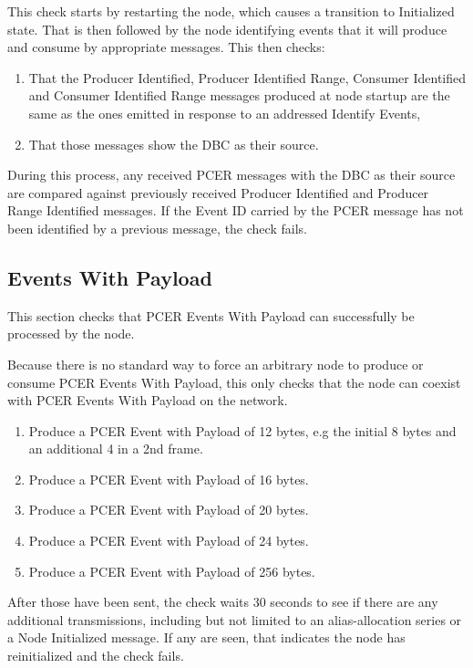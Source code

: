 This check starts by restarting the node, which causes a transition to Initialized
state.  That is then followed by the node identifying events that it will 
produce and consume by appropriate messages. This then checks:

\begin{enumerate}
\item That the Producer Identified, Producer Identified Range, Consumer Identified 
    and Consumer Identified Range messages produced at node startup are the same
    as the ones emitted in response to an addressed Identify Events,
\item That those messages show the DBC as their source.
\end{enumerate}

During this process,  any received PCER messages with the DBC as their source are compared against
previously received Producer Identified and Producer Range Identified messages.
If the Event ID carried by the PCER message has not been identified by 
a previous message, the check fails.

\subsection{Events With Payload}

This section checks that PCER Events With Payload can successfully be processed by 
the node. 

Because there is no standard way to force an arbitrary
node to produce or consume PCER Events With Payload, this only checks
that the node can coexist with PCER Events With Payload on the network.

\begin{enumerate}
\item Produce a PCER Event with Payload of 12 bytes, 
    e.g the initial 8 bytes and an additional 4 in a 2nd frame.
\item Produce a PCER Event with Payload of 16 bytes.
\item Produce a PCER Event with Payload of 20 bytes.
\item Produce a PCER Event with Payload of 24 bytes.
\item Produce a PCER Event with Payload of 256 bytes.
\end{enumerate}

After those have been sent, the check waits 30 seconds to see if there are any additional
transmissions, including but not limited to an alias-allocation series or a Node
Initialized message. If any are seen, that indicates the node has reinitialized
and the check fails.

